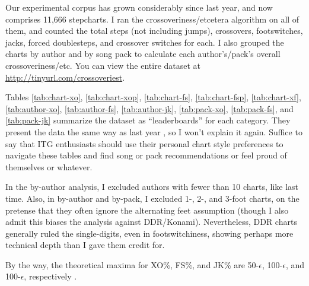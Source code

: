 \documentclass[10pt]{sigplanconf}
\begin{document}
Our experimental corpus has grown considerably since last year, and now comprises 11,666 stepcharts.
I ran the crossoveriness/etcetera algorithm on all of them,
and counted the total steps (not including jumps), crossovers, footswitches, jacks, forced doublesteps, and crossover switches for each.
I also grouped the charts by author and by song pack to calculate each author's/pack's overall crossoveriness/etc.
You can view the entire dataset at \url{http://tinyurl.com/crossoveriest}.

Tables
\ref{tab:chart-xo},
\ref{tab:chart-xop},
\ref{tab:chart-fs},
\ref{tab:chart-fsp},
\ref{tab:chart-xf},
\ref{tab:author-xo},
\ref{tab:author-fs},
\ref{tab:author-jk},
\ref{tab:pack-xo},
\ref{tab:pack-fs},
and
\ref{tab:pack-jk}
summarize the dataset as ``leaderboards'' for each category.
They present the data the same way as last year \cite{turniness},
so I won't explain it again.
Suffice to say that ITG enthusiasts should use their personal chart style preferences to navigate these tables and find song or pack recommendations or feel proud of themselves or whatever.

In the by-author analysis, I excluded authors with fewer than 10 charts, like last time.
Also, in by-author and by-pack, I excluded 1-, 2-, and 3-foot charts,
on the pretense that they often ignore the alternating feet assumption
(though I also admit this biases the analysis against DDR/Konami).
Nevertheless, DDR charts generally ruled the single-digits,
even in footswitchiness,
showing perhaps more technical depth than I gave them credit for.

By the way, the theoretical maxima for XO\%, FS\%, and JK\% are 50-$\epsilon$, 100-$\epsilon$, and 100-$\epsilon$, respectively \cite{epsilon}.
\end{document}
